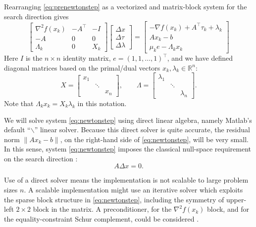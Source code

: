 \documentclass[11pt]{article}
\newcommand{\RR}{\mathbb{R}}
\newcommand{\grad}{\nabla}
\begin{document}
Rearranging \eqref{eq:prenewtonstep} as a vectorized and matrix-block system for the search direction gives
\begin{equation}
\begin{bmatrix}
\grad^2 f(x_k) & -A^\top & -I \\
-A             & 0       & 0  \\
\Lambda_k      & 0       & X_k
\end{bmatrix}
\begin{bmatrix}
\Delta x \\
\Delta \tau \\
\Delta \lambda
\end{bmatrix}
=
\begin{bmatrix}
-\grad f(x_k) + A^\top \tau_k + \lambda_k \\
A x_k - b \\
\mu_k e - \Lambda_k x_k
\end{bmatrix} \label{eq:newtonstep}
\end{equation}
Here $I$ is the $n\times n$ identity matrix, $e=(1,1,\dots,1)^\top$, and we have defined diagonal matrices based on the primal/dual vectors $x_k,\lambda_k\in\RR^n$:
    $$X = \begin{bmatrix} x_1 & & \\ & \ddots & \\ & & x_n \end{bmatrix}, \qquad \Lambda = \begin{bmatrix} \lambda_1 & & \\ & \ddots & \\ & & \lambda_n \end{bmatrix}.$$
Note that $\Lambda_k x_k = X_k \lambda_k$ in this notation.

We will solve system \eqref{eq:newtonstep} using direct linear algebra, namely Matlab's default ``$\backslash$'' linear solver.  Because this direct solver is quite accurate, the residual norm $\|A x_k - b\|$, on the right-hand side of \eqref{eq:newtonstep}, will be very small.  In this sense, system \eqref{eq:newtonstep} imposes the classical null-space requirement on the search direction \cite[chapter 3]{GrivaNashSofer2009}:
\begin{equation}
A \Delta x = 0.  \label{eq:dxnull}
\end{equation}

Use of a direct solver means the implementation is not scalable to large problem sizes $n$.  A scalable implementation might use an iterative solver which exploits the sparse block structure in \eqref{eq:newtonstep}, including the symmetry of upper-left $2\times 2$ block in the matrix.  A preconditioner, for the $\grad^2 f(x_k)$ block, and for the equality-constraint Schur complement, could be considered \cite[chapters 7, 14]{Bueler2021}.
\end{document}
